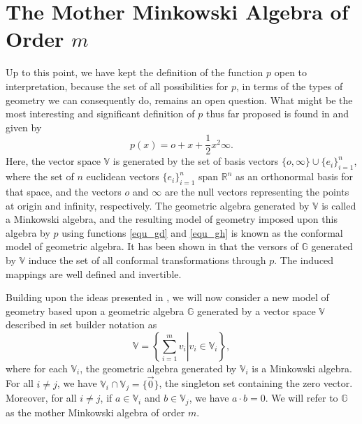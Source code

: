 \documentclass{ecgd-l}
\theoremstyle{definition}
\theoremstyle{remark}
\numberwithin{equation}{section}
\newcommand{\R}{\mathbb{R}}
\newcommand{\G}{\mathbb{G}}
\newcommand{\V}{\mathbb{V}}
\newcommand{\nvai}{\infty}
\newcommand{\nvao}{o}
\begin{document}
\section{The Mother Minkowski Algebra of Order $m$}

Up to this point, we have kept the definition of the function $p$
open to interpretation, because the set of all possibilities for $p$, in terms of the types of geometry
we can consequently do, remains an open question.  What might be the most interesting and significant
definition of $p$ thus far proposed is found in \cite{Hestenes01} and given by
\begin{equation*}
p(x)=\nvao + x + \frac{1}{2}x^2\nvai.
\end{equation*}
Here, the vector space $\V$ is generated by the set
of basis vectors $\{\nvao,\nvai\}\cup\{e_i\}_{i=1}^n$,
where the set of $n$ euclidean vectors $\{e_i\}_{i=1}^n$ span
$\R^n$ as an orthonormal basis for that space, and the
vectors $\nvao$ and $\nvai$ are the null vectors representing the
points at origin and infinity, respectively.  The geometric
algebra generated by $\V$ is called a Minkowski algebra, and the resulting model of
geometry imposed upon this algebra by $p$ using functions \eqref{equ_gd} and \eqref{equ_gh}
is known as the conformal model of geometric algebra.  It has been shown in
\cite{Hestenes01,LiRockwood01,Dorst07} that
the versors of $\G$ generated by $\V$ induce the set of all conformal transformations through $p$.
The induced mappings are well defined and invertible.

Building upon the ideas presented in \cite{DoranHestenes93}, we will now consider
a new model of geometry based upon a geometric algebra $\G$
generated by a vector space $\V$ described in set builder notation as
\begin{equation*}
\V = \left\{\left.\sum_{i=1}^m v_i\right|v_i\in\V_i\right\},
\end{equation*}
where for each $\V_i$, the geometric algebra generated by $\V_i$
is a Minkowski algebra.  For all $i\neq j$, we have $\V_i\cap\V_j=\{\vec{0}\}$,
the singleton set containing the zero vector. Moreover, for all $i\neq j$, if $a\in\V_i$
and $b\in\V_j$, we have $a\cdot b=0$.  We will refer to $\G$ as the mother Minkowski
algebra of order $m$.
\end{document}
